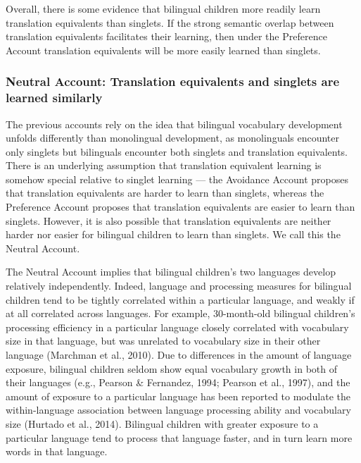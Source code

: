 \documentclass[
  english,
  ,man,floatsintext]{apa6}
\begin{document}
Overall, there is some evidence that bilingual children more readily learn translation equivalents than singlets. If the strong semantic overlap between translation equivalents facilitates their learning, then under the Preference Account translation equivalents will be more easily learned than singlets.

\hypertarget{neutral-account-translation-equivalents-and-singlets-are-learned-similarly}{%
\subsubsection{Neutral Account: Translation equivalents and singlets are learned similarly}\label{neutral-account-translation-equivalents-and-singlets-are-learned-similarly}}

The previous accounts rely on the idea that bilingual vocabulary development unfolds differently than monolingual development, as monolinguals encounter only singlets but bilinguals encounter both singlets and translation equivalents. There is an underlying assumption that translation equivalent learning is somehow special relative to singlet learning --- the Avoidance Account proposes that translation equivalents are harder to learn than singlets, whereas the Preference Account proposes that translation equivalents are easier to learn than singlets. However, it is also possible that translation equivalents are neither harder nor easier for bilingual children to learn than singlets. We call this the Neutral Account.

The Neutral Account implies that bilingual children's two languages develop relatively independently. Indeed, language and processing measures for bilingual children tend to be tightly correlated within a particular language, and weakly if at all correlated across languages. For example, 30-month-old bilingual children's processing efficiency in a particular language closely correlated with vocabulary size in that language, but was unrelated to vocabulary size in their other language (Marchman et al., 2010). Due to differences in the amount of language exposure, bilingual children seldom show equal vocabulary growth in both of their languages (e.g., Pearson \& Fernandez, 1994; Pearson et al., 1997), and the amount of exposure to a particular language has been reported to modulate the within-language association between language processing ability and vocabulary size (Hurtado et al., 2014). Bilingual children with greater exposure to a particular language tend to process that language faster, and in turn learn more words in that language.
\end{document}
